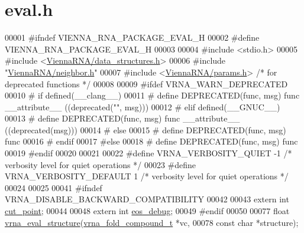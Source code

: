 \hypertarget{eval_8h_source}{}\section{eval.\+h}
\label{eval_8h_source}

\begin{DoxyCode}
00001 \textcolor{preprocessor}{#ifndef VIENNA\_RNA\_PACKAGE\_EVAL\_H}
00002 \textcolor{preprocessor}{#define VIENNA\_RNA\_PACKAGE\_EVAL\_H}
00003 
00004 \textcolor{preprocessor}{#include <stdio.h>}
00005 \textcolor{preprocessor}{#include <\hyperlink{data__structures_8h}{ViennaRNA/data\_structures.h}>}
00006 \textcolor{preprocessor}{#include "\hyperlink{neighbor_8h}{ViennaRNA/neighbor.h}"}
00007 \textcolor{preprocessor}{#include <\hyperlink{params_8h}{ViennaRNA/params.h}>}   \textcolor{comment}{/* for deprecated functions */}
00008 
00009 \textcolor{preprocessor}{#ifdef VRNA\_WARN\_DEPRECATED}
00010 \textcolor{preprocessor}{# if defined(\_\_clang\_\_)}
00011 \textcolor{preprocessor}{#  define DEPRECATED(func, msg) func \_\_attribute\_\_ ((deprecated("", msg)))}
00012 \textcolor{preprocessor}{# elif defined(\_\_GNUC\_\_)}
00013 \textcolor{preprocessor}{#  define DEPRECATED(func, msg) func \_\_attribute\_\_ ((deprecated(msg)))}
00014 \textcolor{preprocessor}{# else}
00015 \textcolor{preprocessor}{#  define DEPRECATED(func, msg) func}
00016 \textcolor{preprocessor}{# endif}
00017 \textcolor{preprocessor}{#else}
00018 \textcolor{preprocessor}{# define DEPRECATED(func, msg) func}
00019 \textcolor{preprocessor}{#endif}
00020 
00021 
00022 \textcolor{preprocessor}{#define VRNA\_VERBOSITY\_QUIET     -1     }\textcolor{comment}{/* verbosity level for quiet operations */}\textcolor{preprocessor}{}
00023 \textcolor{preprocessor}{#define VRNA\_VERBOSITY\_DEFAULT    1     }\textcolor{comment}{/* verbosity level for quiet operations */}\textcolor{preprocessor}{}
00024 
00025 
00041 \textcolor{preprocessor}{#ifndef VRNA\_DISABLE\_BACKWARD\_COMPATIBILITY}
00042 
00043 \textcolor{keyword}{extern} \textcolor{keywordtype}{int}  \hyperlink{group__eval_gab9b2c3a37a5516614c06d0ab54b97cda}{cut\_point};
00044 
00048 \textcolor{keyword}{extern} \textcolor{keywordtype}{int}  \hyperlink{group__eval_ga567530678f6260a1a649a5beca5da4c5}{eos\_debug};
00049 \textcolor{preprocessor}{#endif}
00050 
00077 \textcolor{keywordtype}{float} \hyperlink{group__eval_ga58f199f1438d794a265f3b27fc8ea631}{vrna\_eval\_structure}(\hyperlink{group__fold__compound_structvrna__fc__s}{vrna\_fold\_compound\_t}  *vc,
00078                           \textcolor{keyword}{const} \textcolor{keywordtype}{char}            *structure);

\end{DoxyCode}
